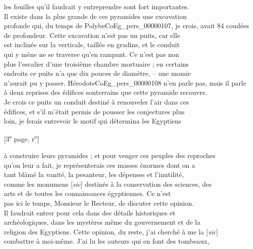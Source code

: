 \documentclass{book}
\begin{document}
les fouilles qu’il faudrait y entreprendre sont fort importantes.\\
Il existe dans la plus grande de ces pyramides une excavation\\
profonde qui, du temps de Polybe\gls{CoEg_pers_00000107}, je crois, avait 84 coudées\\
de profondeur. Cette excavation n’est pas un puits, car elle\\
est inclinée sur la verticale, taillée en gradins, et le conduit\\
qui y mène ne se traverse qu’en rampant. Ce n’est pas non\\
plus l’escalier d’une troisième chambre mortuaire ; en certains\\
endroits ce puits n’a que dix pouces de diamètre, – une momie\\
n’aurait pu y passer. Hérodote\gls{CoEg_pers_00000108} n’en parle pas, mais il parle\\
à deux reprises des édifices souterrains que cette pyramide recouvre.\\
Je crois ce puits un conduit destiné à renouveler l’air dans ces\\
édifices, et s’il m’était permis de pousser les conjectures plus\\
loin, je ferais entrevoir le motif qui détermina les Egyptiens
{\footnotesize \begin{center} {[3\textsuperscript{e} page, r\textsuperscript{o}]}\end{center}}
\noindent à construire leurs pyramides ; et pour venger ces peuples des reproches\\
qu’on leur a fait, je représenterais ces masses énormes dont on a\\
tant blâmé la vanité, la pesanteur, les dépenses et l’inutilité,\\
comme les monumens [\textit{sic}] destinés à la conservation des sciences, des\\
arts et de toutes les connaissances égyptiennes. Ce n’est\\
pas ici le temps, Monsieur le Recteur, de discuter cette opinion.\\
Il faudrait entrer pour cela dans des détails historiques et\\
archéologiques, dans les mystères même du gouvernement et de la\\
religion des Egyptiens. Cette opinion, du reste, j’ai cherché à me la [\textit{sic}]\\
combattre à moi-même. J’ai lu les auteurs qui en font des tombeaux,\\
\end{document}
